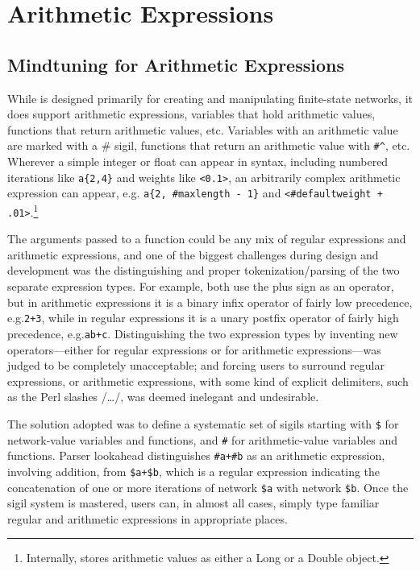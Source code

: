 \chapter{Arithmetic Expressions}

\section{Mindtuning for Arithmetic Expressions}

While \Kleene{} is designed primarily for creating and manipulating
finite-state networks, it does support arithmetic expressions, variables
that hold arithmetic values, functions that return arithmetic values,
etc.  Variables with an arithmetic value are marked with a \# sigil,
functions that return an arithmetic value with \verb!#^!, etc.  Wherever a
simple integer or float can appear in \Kleene{} syntax, including
numbered iterations like \verb!a{2,4}! and weights like \verb!<0.1>!, an
arbitrarily complex arithmetic expression can appear, e.g.\@ 
\verb!a{2, #maxlength - 1}! and \verb!<#defaultweight + .01>!.\footnote{Internally,
\Kleene{} stores arithmetic values as either a Long or a Double object.}

The arguments passed to a function could be any mix of regular
expressions and arithmetic expressions, and one of the biggest challenges
during \Kleene{} design and development was the distinguishing and proper
tokenization/parsing of the two separate expression types.  For example,
both use the plus sign as an operator, but in arithmetic expressions it
is a binary infix operator of fairly low precedence, e.g.\@  \verb!2+3!,
while in regular expressions it is a unary postfix operator of fairly
high precedence, e.g.\@ \verb!ab+c!.  Distinguishing the two
expression types by inventing new operators---either for regular
expressions or for arithmetic expressions---was judged to be
completely unacceptable; and forcing users to surround regular
expressions, or arithmetic expressions, with some kind of explicit
delimiters, such as the Perl slashes /\ldots/, was deemed inelegant
and undesirable.

The solution adopted was to define a systematic set of sigils starting
with \verb!$! for network-value variables and functions, and \verb!#! for
arithmetic-value variables and functions.  Parser lookahead distinguishes
\verb!#a+#b! as an arithmetic expression, involving addition, from
\verb!$a+$b!, which is a regular expression indicating the concatenation
of one or more iterations of network \verb!$a! with network \verb!$b!.
Once the sigil system is mastered, users can, in almost all cases, simply
type familiar regular and arithmetic expressions in appropriate places. 

